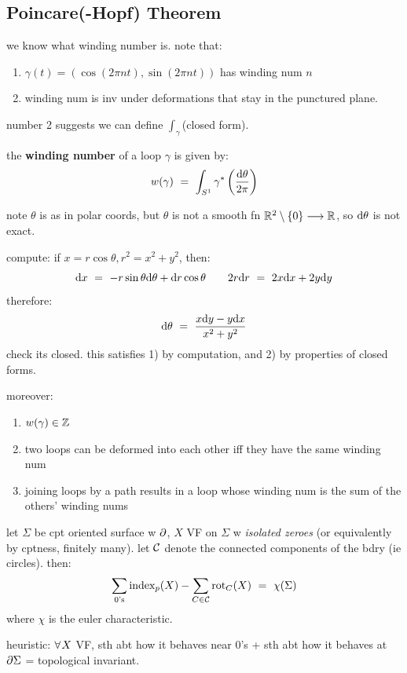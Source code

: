 \subsection{Poincare(-Hopf) Theorem}

we know what winding number is. note that:
\begin{enumerate}[1)]
	\item $\gamma(t)=(\cos(2\pi nt),\sin(2\pi nt))$ has winding num $n$
	\item winding num is inv under deformations that stay in the punctured plane.
\end{enumerate}
number 2 suggests we can define $\int_{\gamma}$(closed form).

\begin{defn}
	the \textbf{winding number} of a loop $\gamma$ is given by:
	\begin{equation*}
		w(\gamma) \ = \ \int_{S^{1}}\gamma^{*}\left(\frac{\d\theta}{2\pi}\right)
	\end{equation*}
\end{defn}
note $\theta$ is as in polar coords, but $\theta$ is not a smooth fn
$\mathbb{R}^{2}\setminus\left\{{0}\right\}\longrightarrow\mathbb{R}$, so $\textrm{d}\theta$ is not exact.

compute: if $x=r\cos\theta,r^{2}=x^{2}+y^{2}$, then:
\begin{equation*}
	\textrm{d} x \ = \ -r\sin\theta\textrm{d}\theta+\textrm{d} r\cos\theta \qquad
	2r\textrm{d} r \ = \ 2x\textrm{d} x+2y\textrm{d} y
\end{equation*}
therefore:
\begin{equation*}
	\textrm{d}\theta \ = \ \frac{x\textrm{d} y-y\textrm{d} x}{x^{2}+y^{2}}
\end{equation*}
check its closed.
this satisfies 1) by computation, and 2) by properties of closed forms.

moreover:
\begin{enumerate}[1)]
	\item $w(\gamma)\in\mathbb{Z}$
	\item two loops can be deformed into each other iff they have the same winding num
	\item joining loops by a path results in a loop whose winding num is the
		sum of the others' winding nums
\end{enumerate}

\begin{thm}[title=Poincare's Theorem]
	let $\Sigma$ be cpt oriented surface w $\partial$, $X$ VF on $\Sigma$ w \textit{isolated zeroes}
	(or equivalently by cptness, finitely many).
	let $\mathcal{C}$ denote the connected components of the bdry (ie circles).
	then:
	\begin{equation*}
		\sum_{\textrm{0's}}\textrm{index}_{p}(X) - \sum_{C\in\mathcal{C}}\textrm{rot}_{C}(X) \ = \ \chi(\Sigma)
	\end{equation*}
	where $\chi$ is the euler characteristic.
\end{thm}
heuristic: $\fa X$ VF, sth abt how it behaves near 0's + sth abt how it behaves
at $\partial\Sigma$ = topological invariant.

